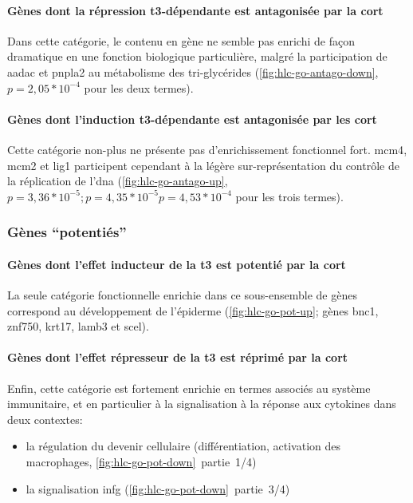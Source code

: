 \documentclass[../main.tex]{subfiles}
\begin{document}
\paragraph{Gènes dont la répression \gls{t3}-dépendante est antagonisée par la \gls{cort}}
Dans cette catégorie, le contenu en gène ne semble pas enrichi de façon dramatique en une fonction biologique particulière, malgré la participation de \gls{aadac} et \gls{pnpla2} au métabolisme des tri-glycérides (\autoref{fig:hlc-go-antago-down}, $\textit{p} = 2,05 * 10^{-4}$ pour les deux termes).



\paragraph{Gènes dont l'induction \gls{t3}-dépendante est antagonisée par les \gls{cort}}
Cette catégorie non-plus ne présente pas d'enrichissement fonctionnel fort.
\gls{mcm4}, \gls{mcm2} et \gls{lig1} participent cependant à la légère sur-représentation du contrôle de la réplication de l'\gls{dna} (\autoref{fig:hlc-go-antago-up}, $\textit{p}=3,36*10^{-5}; \textit{p}=4,35*10^{-5}\textit{p}=4,53*10^{-4}$ pour les trois termes).




\subsubsection{Gènes ``potentiés''}

\paragraph{Gènes dont l'effet inducteur de la \gls{t3} est potentié par la \gls{cort}}
La seule catégorie fonctionnelle enrichie dans ce sous-ensemble de gènes correspond au développement de l'épiderme (\autoref{fig:hlc-go-pot-up}; gènes \gls{bnc1}, \gls{znf750}, \gls{krt17}, \gls{lamb3} et \gls{scel}).



\paragraph{Gènes dont l'effet répresseur de la \gls{t3} est réprimé par la \gls{cort}}\label{par:hlc-go-pot-down}
Enfin, cette catégorie est fortement enrichie en termes associés au système immunitaire, et en particulier à la signalisation à la réponse aux cytokines dans deux contextes:
\begin{itemize}
\item la régulation du devenir cellulaire (différentiation, activation des macrophages, \autoref{fig:hlc-go-pot-down}~partie~1/4)
\item la signalisation \gls{infg} (\autoref{fig:hlc-go-pot-down}~partie~3/4)
\end{itemize}
\end{document}
